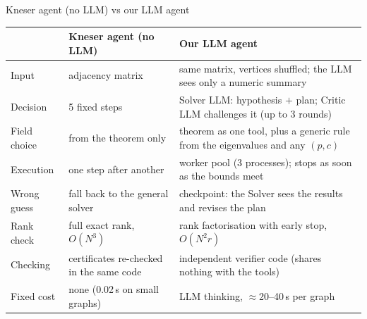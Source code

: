 \documentclass[11pt]{beamer}
\begin{document}
\begin{frame}{Kneser agent (no LLM) vs our LLM agent}
  \scriptsize
  \renewcommand{\arraystretch}{1.25}
  \begin{tabularx}{\textwidth}{@{}>{\raggedright\arraybackslash}p{1.75cm}LL@{}}
    \toprule
    & \textbf{Kneser agent (no LLM)} & \textbf{Our LLM agent} \\
    \midrule
    Input & adjacency matrix & same matrix, vertices shuffled; the LLM sees only a numeric summary \\
    Decision & 5 fixed steps & Solver LLM: hypothesis $+$ plan; Critic LLM challenges it (up to 3 rounds) \\
    Field choice & from the theorem only & theorem as one tool, plus a generic rule from the eigenvalues and any $(p,c)$ \\
    Execution & one step after another & worker pool (3 processes); stops as soon as the bounds meet \\
    Wrong guess & fall back to the general solver & checkpoint: the Solver sees the results and revises the plan \\
    Rank check & full exact rank, $O(N^3)$ & rank factorisation with early stop, $O(N^2 r)$ \\
    Checking & certificates re-checked in the same code & independent verifier code (shares nothing with the tools) \\
    Fixed cost & none (0.02\,s on small graphs) & LLM thinking, $\approx$20--40\,s per graph \\
    \bottomrule
  \end{tabularx}
\end{frame}
\end{document}
